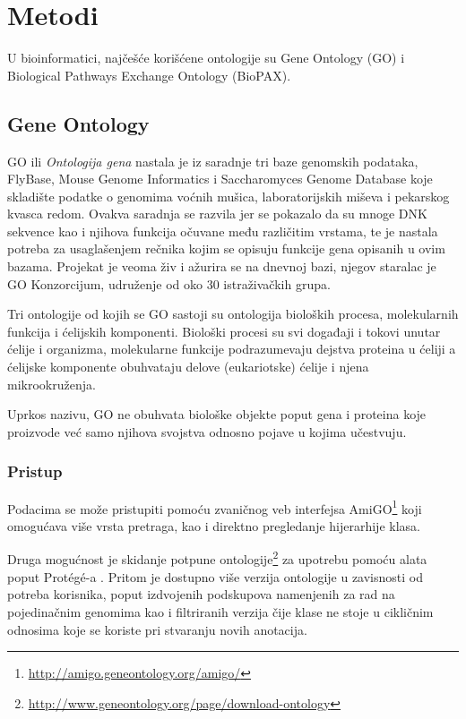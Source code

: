 \section{Metodi}
\label{sec:metodi}

U bioinformatici, najčešće korišćene ontologije su Gene Ontology (GO) i Biological Pathways Exchange Ontology (BioPAX).

\subsection{Gene Ontology}

GO ili \emph{Ontologija gena} nastala je iz saradnje tri baze genomskih podataka, FlyBase, Mouse Genome Informatics i Saccharomyces Genome Database koje skladište podatke o genomima voćnih mušica, laboratorijskih miševa i pekarskog kvasca redom.
Ovakva saradnja se razvila jer se pokazalo da su mnoge DNK sekvence kao i njihova funkcija očuvane među različitim vrstama, te je nastala potreba za usaglašenjem rečnika kojim se opisuju funkcije gena opisanih u ovim bazama. Projekat je veoma živ i ažurira se na dnevnoj bazi, njegov staralac je GO Konzorcijum, udruženje od oko 30 istraživačkih grupa.

Tri ontologije od kojih se GO sastoji su ontologija bioloških procesa, molekularnih funkcija i ćelijskih komponenti. Biološki procesi su svi događaji i tokovi unutar ćelije i organizma, molekularne funkcije podrazumevaju dejstva proteina u ćeliji a ćelijske komponente obuhvataju delove (eukariotske) ćelije i njena mikrookruženja.

Uprkos nazivu, GO ne obuhvata biološke objekte poput gena i proteina koje proizvode već samo njihova svojstva odnosno pojave u kojima učestvuju. 

\subsubsection{Pristup}
Podacima se može pristupiti pomoću zvaničnog veb interfejsa AmiGO\footnote{\url{http://amigo.geneontology.org/amigo/}} koji omogućava više vrsta pretraga, kao i direktno pregledanje hijerarhije klasa.

Druga mogućnost je skidanje potpune ontologije\footnote{\url{http://www.geneontology.org/page/download-ontology}} za upotrebu pomoću alata poput Protégé-a .
Pritom je dostupno više verzija ontologije u zavisnosti od potreba korisnika, poput izdvojenih podskupova namenjenih za rad na pojedinačnim genomima kao i filtriranih verzija čije klase ne stoje u cikličnim odnosima koje se koriste pri stvaranju novih anotacija.

